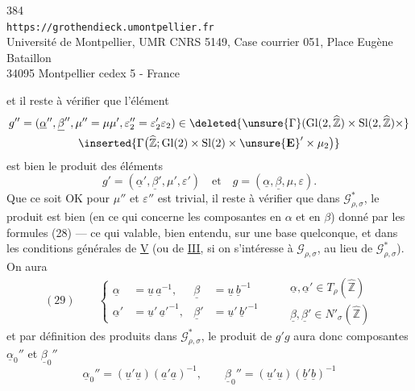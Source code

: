 \begin{center}
384\\
\texttt{https://grothendieck.umontpellier.fr}\\
Université de Montpellier, UMR CNRS 5149, Case courrier 051, Place Eugène Bataillon\\
34095 Montpellier cedex 5 - France
\end{center}

et il reste à vérifier que l'élément
\[
\begin{gathered}
g''=(\underline\alpha'',\underline\beta'',\mu''=\mu\mu',\varepsilon_2''=\varepsilon_2'\varepsilon_2)
\in\deleted{\unsure{\Gamma}(\mathrm{Gl}(2,\widehat{\mathbb Z})\times\mathrm{Sl}(2,\widehat{\mathbb Z})\times}\\
\inserted{\Gamma\bigl(\widehat{\mathbb Z};\mathrm{Gl}(2)\times\mathrm{Sl}(2)\times\unsure{\mathbf E}'\times\mu_2\bigr)}
\end{gathered}
\]
est bien le produit des éléments
\[
g'=(\underline\alpha',\underline\beta',\mu',\varepsilon')\quad\text{et}\quad
g=(\underline\alpha,\underline\beta,\mu,\varepsilon).
\]
Que ce soit OK pour $\mu''$ et $\varepsilon''$ est trivial, il reste à vérifier que dans $\mathcal G_{\rho,\sigma}^{*}$, le produit est bien (en ce qui concerne les composantes en $\alpha$ et en $\beta$) donné par les formules (28) --- ce qui  valable, bien entendu, sur une base quelconque, et dans les conditions générales de \uline{V} (ou  de \uline{III}, si on s'intéresse à $\mathcal G_{\rho,\sigma}$, au lieu de $\mathcal G_{\rho,\sigma}^{*}$). On aura
\[
(29)\qquad
\left\{\begin{aligned}
\underline\alpha&=\underline u\,\underline a^{-1},&
\underline\beta&=\underline u\,\underline b^{-1}\\
\underline\alpha'&=\underline u'\,\underline a'^{-1},&
\underline\beta'&=\underline u'\,\underline b'^{-1}
\end{aligned}\right.
\qquad
\begin{gathered}
\underline\alpha,\underline\alpha'\in T_\rho(\widehat{\mathbb Z})\\
\underline\beta,\underline\beta'\in N'_\sigma(\widehat{\mathbb Z})
\end{gathered}
\]
et par définition des produits dans $\mathcal G_{\rho,\sigma}^{*}$, le produit de  $g'g$ aura donc composantes $\underline\alpha_0''$ et $\underline\beta_0''$
\[
\underline\alpha_0''=(\underline u'\underline u)(\underline a'\underline a)^{-1},\qquad
\underline\beta_0''=(\underline u'\underline u)(\underline b'\underline b)^{-1}
\]
